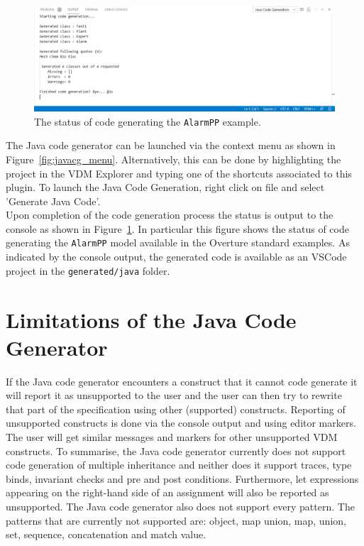 \begin{figure}[htbp]
\begin{center}
\includegraphics[width=\linewidth]{snapshots/Status of code generating the Alarm PP example.png}
\caption{The status of code generating the \texttt{AlarmPP}
example.\label{fig:javacg_output}}
\end{center}
\end{figure}

The Java code generator can be launched via the context menu as shown
in Figure~\ref{fig:javacg_menu}. Alternatively, this can be done by
highlighting the project in the VDM Explorer and typing one of the
shortcuts associated to this plugin. To launch the Java Code Generation, right click on file and select 'Generate Java Code'.\\


\noindent Upon completion of the code generation process the status is
output to the console as shown in Figure~\ref{fig:javacg_output}. In
particular this figure shows the status of code generating the
\texttt{AlarmPP} model available in the Overture standard examples. As
indicated by the console output, the generated code is available as an
VSCode project in the \texttt{generated/java}
folder.




\section{Limitations of the Java Code Generator}

If the Java code generator encounters a construct that it cannot code
generate it will report it as unsupported to the user and the user can
then try to rewrite that part of the specification using other
(supported) constructs. Reporting of unsupported constructs is done
via the console output and using editor markers.\\

\clearpage
The user will get similar messages and markers for other unsupported
VDM constructs. To summarise, the Java code generator currently does
not support code generation of multiple inheritance and neither does
it support traces, type binds, invariant checks and pre and post
conditions. Furthermore, let expressions appearing on the right-hand
side of an assignment will also be reported as unsupported. The Java
code generator also does not support every pattern. The patterns that
are currently not supported are: object, map union, map, union, set,
sequence, concatenation and match value.

